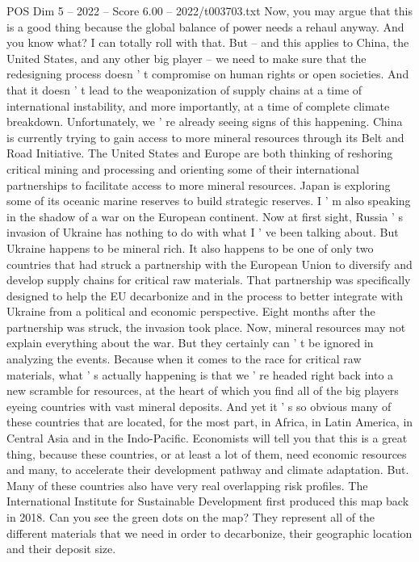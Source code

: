\begin{textsample}{POS Dim 5 – 2022 – Score 6.00 – 2022/t003703.txt}
Now, you may argue that this is a good thing because the global balance of power needs a rehaul anyway.
And you know what?
I can totally roll with that.
But -- and this applies to China, the United States, and any other big player -- we need to make sure that the redesigning process doesn ' t compromise on human rights or open societies.
And that it doesn ' t lead to the weaponization of supply chains at a time of international instability, and more importantly, at a time of complete climate breakdown.
Unfortunately, we ' re already seeing signs of this happening.
China is currently trying to gain access to more mineral resources through its Belt and Road Initiative.
The United States and Europe are both thinking of reshoring critical mining and processing and orienting some of their international partnerships to facilitate access to more mineral resources.
Japan is exploring some of its oceanic marine reserves to build strategic reserves.
I ' m also speaking in the shadow of a war on the European continent.
Now at first sight, Russia ' s invasion of Ukraine has nothing to do with what I ' ve been talking about.
But Ukraine happens to be mineral rich.
It also happens to be one of only two countries that had struck a partnership with the European Union to diversify and develop supply chains for critical raw materials.
That partnership was specifically designed to help the EU decarbonize and in the process to better integrate with Ukraine from a political and economic perspective.
Eight months after the partnership was struck, the invasion took place.
Now, mineral resources may not explain everything about the war.
But they certainly can ' t be ignored in analyzing the events.
Because when it comes to the race for critical raw materials, what ' s actually happening is that we ' re headed right back into a new scramble for resources, at the heart of which you find all of the big players eyeing countries with vast mineral deposits.
And yet it ' s so obvious many of these countries that are located, for the most part, in Africa, in Latin America, in Central Asia and in the Indo-Pacific.
Economists will tell you that this is a great thing, because these countries, or at least a lot of them, need economic resources and many, to accelerate their development pathway and climate adaptation.
But.
Many of these countries also have very real overlapping risk profiles.
The International Institute for Sustainable Development first produced this map back in 2018.
Can you see the green dots on the map?
They represent all of the different materials that we need in order to decarbonize, their geographic location and their deposit size.

\end{textsample}
